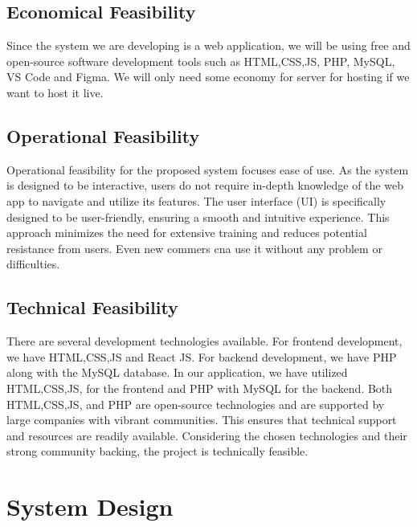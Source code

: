 \subsection{Economical Feasibility}
Since the system we are developing is a web application, we will be using free and open-source software development tools such as HTML,CSS,JS, PHP, MySQL, VS Code and Figma. We will only need some economy for server for hosting if we want to host it live.
\subsection{Operational Feasibility}
Operational feasibility for the proposed system focuses ease of use. As the system is designed to be interactive, users do not require in-depth knowledge of the web app to navigate and utilize its features. The user interface (UI) is specifically designed to be user-friendly, ensuring a smooth and intuitive experience. This approach minimizes the need for extensive training and reduces potential resistance from users. Even new commers cna use it without any problem or difficulties. 
\subsection{Technical Feasibility}
There are several development technologies available. For frontend development, we have HTML,CSS,JS and React JS. For backend development, we have PHP along with the MySQL database. In our application, we have utilized HTML,CSS,JS, for the frontend and PHP with MySQL for the backend. Both HTML,CSS,JS, and PHP are open-source technologies and are supported by large companies with vibrant communities. This ensures that technical support and resources are readily available. Considering the chosen technologies and their strong community backing, the project is technically feasible.
\newpage
\section{System Design}
